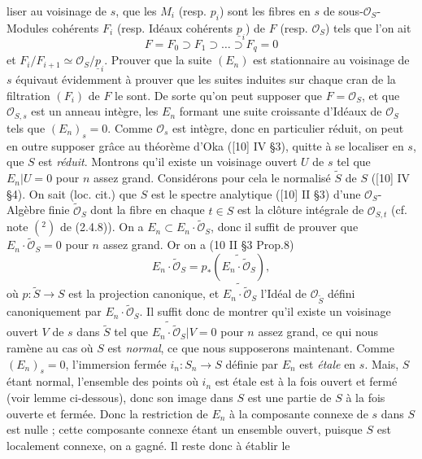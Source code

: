 liser au voisinage de $s$, que les $M_i$ (resp. $p_i$) sont les fibres en $s$ de sous-$\mathcal O_S$-Modules cohérents $F_i$ (resp. Idéaux cohérents $\underline{p}_i$) de $F$ (resp. $\mathcal O_S$) tels que l'on ait
\[
 F=F_0\supset F_1\supset\ldots\supset F_q=0
\]
et $F_i/F_{i+1}\simeq\mathcal O_S/\underline{p}_i$. Prouver que la suite $(E_n)$ est stationnaire au voisinage de $s$ équivaut évidemment à prouver que les suites induites sur chaque cran de la filtration $(F_i)$ de $F$ le sont. De sorte qu'on peut supposer que $F=\mathcal O_S$, et que $\mathcal O_{S,s}$ est un anneau intègre, les $E_n$ formant une suite croissante d'Idéaux de $\mathcal O_S$ tels que $(E_n)_s=0$. Comme $\mathcal O_s$ est intègre, donc en particulier réduit, on peut en outre supposer grâce au théorème d'Oka ([10] IV \S3), quitte à se localiser en $s$, que $S$ est \emph{réduit}. Montrons qu'il existe un voisinage ouvert $U$ de $s$ tel que $E_n|U=0$ pour $n$ assez grand. Considérons pour cela le normalisé $\widetilde S$ de $S$ ([10] IV \S4). On sait (loc. cit.) que $S$ est le spectre analytique ([10] II \S3) d'une $\mathcal O_S$-Algèbre finie $\widetilde{\mathcal O}_S$ dont la fibre en chaque $t\in S$ est la clôture intégrale de $\mathcal O_{S,t}$ (cf. note $(^2)$ de (2.4.8)). On a $E_n\subset E_n\cdot\widetilde{\mathcal O}_S$, donc il suffit de prouver que $E_n\cdot\widetilde{\mathcal O}_S=0$ pour $n$ assez grand. Or on a (10 II \S3 Prop.8)
\[
 E_n\cdot\widetilde{\mathcal O}_S = p_*(\widetilde{E_n\cdot\widetilde{\mathcal O}_S}),
\]
où $p:\widetilde S\longrightarrow S$ est la projection canonique, et $\widetilde{E_n\cdot\widetilde{\mathcal O}_S}$ l'Idéal de $\mathcal O_{\widetilde S}$ défini canoniquement par $E_n\cdot\widetilde{\mathcal O}_S$. Il suffit donc de montrer qu'il existe un voisinage ouvert $V$ de $s$ dans $\widetilde S$ tel que $\widetilde{E_n\cdot\widetilde{\mathcal O}_S}|V=0$ pour $n$ assez grand, ce qui nous ramène au cas où $S$ est \emph{normal}, ce que nous supposerons maintenant. Comme $(E_n)_s=0$, l'immersion fermée $i_n:S_n\longrightarrow S$ définie par $E_n$ est \emph{étale} en $s$. Mais, $S$ étant normal, l'ensemble des points où $i_n$ est étale est à la fois ouvert et fermé (voir lemme ci-dessous), donc son image dans $S$ est une partie de $S$ à la fois ouverte et fermée. Donc la restriction de $E_n$ à la composante connexe de $s$ dans $S$ est nulle ; cette composante connexe étant un ensemble ouvert, puisque $S$ est localement connexe, on a gagné. Il reste donc à établir le

